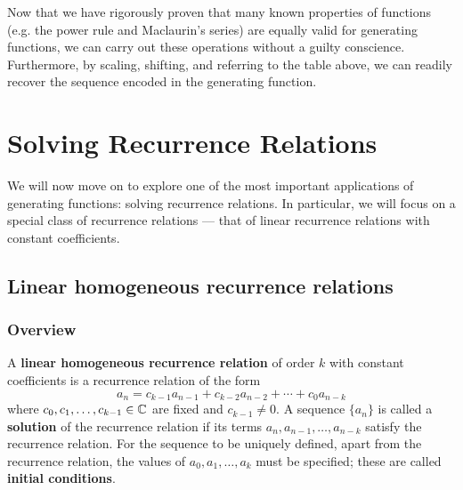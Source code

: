 \documentclass[a4paper, 12pt]{report}
\begin{document}
Now that we have rigorously proven that many known properties of functions (e.g. the power rule and Maclaurin's series) are equally valid for generating functions, we can carry out these operations without a guilty conscience. Furthermore, by scaling, shifting, and referring to the table above, we can readily recover the sequence encoded in the generating function.





\chapter{Solving Recurrence Relations}\label{ch:recurrence}
We will now move on to explore one of the most important applications of generating functions: solving recurrence relations. In particular, we will focus on a special class of recurrence relations --- that of linear recurrence relations with constant coefficients.

\section{Linear homogeneous recurrence relations}
\subsection{Overview}
\begin{defn}\label{def:lin-homo-recur}
A \textbf{linear homogeneous recurrence relation} of order $k$ with constant coefficients is a recurrence relation of the form \[a_n = c_{k - 1} a_{n - 1} + c_{k - 2} a_{n - 2} + \cdots + c_0 a_{n - k}\]
where $c_0, c_1, \dots, c_{k - 1} \in \mathbb{C}$ are fixed and $c_{k - 1} \neq 0$.
A sequence $\{a_n\}$ is called a \textbf{solution} of the recurrence relation if its terms $a_n, a_{n - 1}, \dots, a_{n - k}$ satisfy the recurrence relation. For the sequence to be uniquely defined, apart from the recurrence relation, the values of $a_0, a_1, \dots, a_k$ must be specified; these are called \textbf{initial conditions}.
\end{defn}
\end{document}
